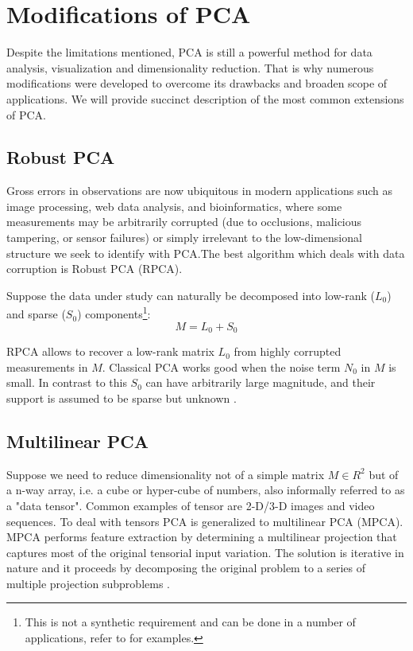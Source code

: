 \section{Modifications of PCA}
Despite the limitations mentioned, PCA is still a powerful method for data analysis, visualization and dimensionality reduction. That is why numerous modifications were developed to overcome its drawbacks and broaden scope of applications. We will provide succinct description of the most common extensions of PCA.

\subsection{Robust PCA}
Gross errors in observations are now ubiquitous in modern applications
such as image processing, web data analysis, and bioinformatics, where some measurements
may be arbitrarily corrupted (due to occlusions, malicious tampering, or sensor failures) or simply irrelevant to the low-dimensional structure we seek to identify with PCA.The best algorithm which deals with data corruption is Robust PCA (RPCA).

Suppose the data under study can naturally be decomposed into low-rank ($L_0$) and sparse ($S_0$) components\footnote{This is not a synthetic requirement and can be done in a number of applications, refer to \citep{cardes} for examples.}:
\begin{equation}
M = L_0 + S_0
\end{equation}

RPCA allows to recover a low-rank matrix $L_0$ from highly corrupted measurements in $M$. Classical PCA works good when the noise term $N_0$ in $M$ is small. In contrast to this $S_0$ can have arbitrarily large magnitude, and their support is assumed to be sparse but unknown \citep{cardes}.


\subsection{Multilinear PCA}
Suppose we need to reduce dimensionality not of a simple matrix $M \in R^2$ but of a n-way array, i.e. a cube or hyper-cube of numbers, also informally referred to as a "data tensor". Common examples of tensor are 2-D/3-D images and video sequences. To deal with tensors PCA is generalized to multilinear PCA (MPCA). MPCA performs feature extraction by determining a multilinear projection that captures most of the original tensorial input variation. The solution is iterative in nature and it proceeds by decomposing the original problem to a series of multiple projection subproblems \citep{lu}. 

